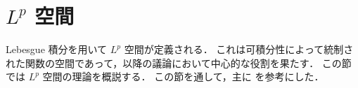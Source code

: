 \section{\texorpdfstring{$L^p$ 空間}{Lp 空間}}

Lebesgue 積分を用いて $L^p$ 空間が定義される．
これは可積分性によって統制された関数の空間であって，以降の議論において中心的な役割を果たす．
この節では $L^p$ 空間の理論を概説する．
この節を通して，主に \cite{Br11} を参考にした．


